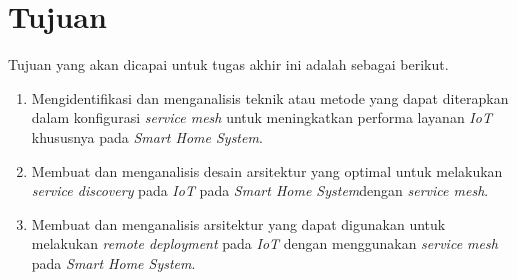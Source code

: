 \section{Tujuan}

Tujuan yang akan dicapai untuk tugas akhir ini adalah sebagai berikut.

\begin{enumerate}
  \item Mengidentifikasi dan menganalisis teknik atau metode yang dapat diterapkan dalam konfigurasi \textit{service mesh} untuk meningkatkan performa layanan \textit{IoT} khususnya pada \textit{Smart Home System}.
  \item Membuat dan menganalisis desain arsitektur yang optimal untuk melakukan \textit{service discovery} pada \textit{IoT} pada \textit{Smart Home System}dengan \textit{service mesh}.
  \item Membuat dan menganalisis arsitektur yang dapat digunakan untuk melakukan \textit{remote deployment} pada \textit{IoT} dengan menggunakan \textit{service mesh} pada \textit{Smart Home System}.
\end{enumerate}